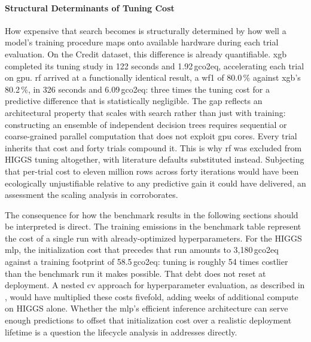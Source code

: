 \paragraph{Structural Determinants of Tuning Cost}
How expensive that search becomes is structurally determined by how well a model's training procedure maps onto available hardware during each trial evaluation. On the Credit dataset, this difference is already quantifiable. \gls{xgb} completed its tuning study in 122 seconds and 1.92\,\gls{gco2eq}, accelerating each trial on \gls{gpu}. \gls{rf} arrived at a functionally identical result, a \gls{wf1} of 80.0\,\% against \gls{xgb}'s 80.2\,\%, in 326 seconds and 6.09\,\gls{gco2eq}: three times the tuning cost for a predictive difference that is statistically negligible. The gap reflects an architectural property that scales with search rather than just with training: constructing an ensemble of independent decision trees requires sequential or coarse-grained parallel computation that does not exploit \gls{gpu} cores. Every trial inherits that cost and forty trials compound it. This is why \gls{rf} was excluded from HIGGS tuning altogether, with literature defaults substituted instead. Subjecting that per-trial cost to eleven million rows across forty iterations would have been ecologically unjustifiable relative to any predictive gain it could have delivered, an assessment the scaling analysis in  corroborates.

The consequence for how the benchmark results in the following sections should be interpreted is direct. The training emissions in the benchmark table represent the cost of a single run with already-optimized hyperparameters. For the HIGGS \gls{mlp}, the initialization cost that precedes that run amounts to 3{,}180\,\gls{gco2eq} against a training footprint of 58.5\,\gls{gco2eq}: tuning is roughly 54 times costlier than the benchmark run it makes possible. That debt does not reset at deployment. A nested \gls{cv} approach for hyperparameter evaluation, as described in , would have multiplied these costs fivefold, adding weeks of additional compute on HIGGS alone. Whether the \gls{mlp}'s efficient inference architecture can serve enough predictions to offset that initialization cost over a realistic deployment lifetime is a question the lifecycle analysis in  addresses directly.

